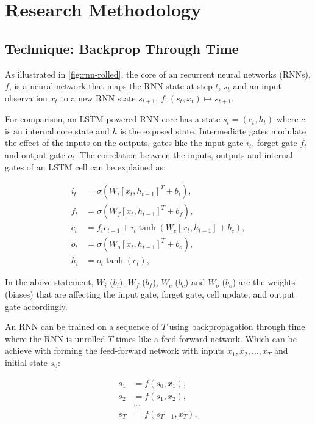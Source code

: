 \chapter{Research Methodology}
\label{chap:method}

\section{Technique: Backprop Through Time}
\label{sec:bptt}

As illustrated in \ref{fig:rnn-rolled}, the core of an recurrent neural networks (RNNs), $f$, is a neural network that maps the RNN state at step $t$, $s_t$ and an input observation $x_t$ to a new RNN state $s_{t+1}$, $f: (s_t, x_t) \mapsto s_{t+1}$.

For comparison, an LSTM-powered RNN core \cite{Hochreiter1997} has a state $s_t = (c_t, h_t)$ where $c$ is an internal core state and $h$ is the exposed state. Intermediate gates modulate the effect of the inputs on the outputs, gates like the input gate $i_t$, forget gate $f_t$ and output gate $o_t$. The correlation between the inputs, outputs and internal gates of an LSTM cell can be explained as:

\begin{align*}
i_t &= \sigma(W_i [x_t, h_{t-1}]^T + b_i), \\
f_t &= \sigma(W_f [x_t, h_{t-1}]^T + b_f), \\
c_t &= f_t c_{t-1} + i_t \tanh(W_c [x_t, h_{t-1}] + b_c), \\
o_t &= \sigma(W_o [x_t, h_{t-1}]^T + b_o), \\
h_t &= o_t \tanh(c_t),
\end{align*}

In the above statement, $W_i$ ($b_i$), $W_f$ ($b_f$), $W_c$ ($b_c$) and $W_o$ ($b_o$) are the weights (biases) that are affecting the input gate, forget gate, cell update, and output gate accordingly.

An RNN can be trained on a sequence of $T$ using backpropagation through time where the RNN is unrolled $T$ times like a feed-forward network.
Which can be achieve with forming the feed-forward network with inputs
$x_1, x_2, \dots, x_T$ and initial state $s_0$:

\begin{align}
s_1 &= f(s_0, x_1), \nonumber \\
s_2 &= f(s_1, x_2), \nonumber \\
&\dots \nonumber \\
\label{eq:unroll}
s_T &= f(s_{T-1}, x_T), 
\end{align}

